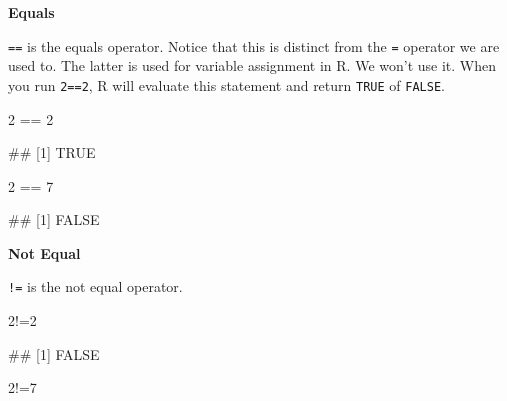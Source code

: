 \documentclass[
]{book}
\newenvironment{Shaded}{\begin{snugshade}}{\end{snugshade}}
\newcommand{\DecValTok}[1]{\textcolor[rgb]{0.00,0.00,0.81}{#1}}
\newcommand{\NormalTok}[1]{#1}
\newcommand{\SpecialCharTok}[1]{\textcolor[rgb]{0.00,0.00,0.00}{#1}}
\begin{document}
\textbf{Equals}

\texttt{==} is the equals operator. Notice that this is distinct from the \texttt{=} operator we are used to. The latter is used for variable assignment in R. We won't use it. When you run \texttt{2==2}, R will evaluate this statement and return \texttt{TRUE} of \texttt{FALSE}.

\begin{Shaded}
\begin{Highlighting}[]
\DecValTok{2} \SpecialCharTok{==} \DecValTok{2}
\end{Highlighting}
\end{Shaded}

\begin{Shaded}
\begin{Highlighting}[]
\NormalTok{\#\# [1] TRUE}
\end{Highlighting}
\end{Shaded}

\begin{Shaded}
\begin{Highlighting}[]
\DecValTok{2} \SpecialCharTok{==} \DecValTok{7}
\end{Highlighting}
\end{Shaded}

\begin{Shaded}
\begin{Highlighting}[]
\NormalTok{\#\# [1] FALSE}
\end{Highlighting}
\end{Shaded}

\textbf{Not Equal}

\texttt{!=} is the not equal operator.

\begin{Shaded}
\begin{Highlighting}[]
\DecValTok{2}\SpecialCharTok{!=}\DecValTok{2}
\end{Highlighting}
\end{Shaded}

\begin{Shaded}
\begin{Highlighting}[]
\NormalTok{\#\# [1] FALSE}
\end{Highlighting}
\end{Shaded}

\begin{Shaded}
\begin{Highlighting}[]
\DecValTok{2}\SpecialCharTok{!=}\DecValTok{7}
\end{Highlighting}
\end{Shaded}
\end{document}
